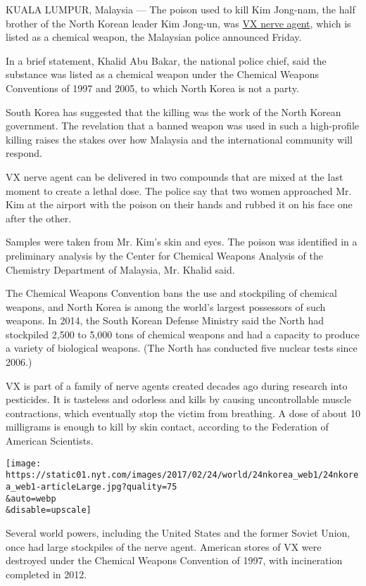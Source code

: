 KUALA LUMPUR, Malaysia --- The poison used to kill Kim Jong-nam, the
half brother of the North Korean leader Kim Jong-un, was
\href{https://www.nytimes.com/2017/02/24/world/asia/vx-nerve-agent-kim-jong-nam.html}{VX
nerve agent}, which is listed as a chemical weapon, the Malaysian police
announced Friday.

In a brief statement, Khalid Abu Bakar, the national police chief, said
the substance was listed as a chemical weapon under the Chemical Weapons
Conventions of 1997 and 2005, to which North Korea is not a party.

South Korea has suggested that the killing was the work of the North
Korean government. The revelation that a banned weapon was used in such
a high-profile killing raises the stakes over how Malaysia and the
international community will respond.

VX nerve agent can be delivered in two compounds that are mixed at the
last moment to create a lethal dose. The police say that two women
approached Mr. Kim at the airport with the poison on their hands and
rubbed it on his face one after the other.

Samples were taken from Mr. Kim's skin and eyes. The poison was
identified in a preliminary analysis by the Center for Chemical Weapons
Analysis of the Chemistry Department of Malaysia, Mr. Khalid said.

The Chemical Weapons Convention bans the use and stockpiling of chemical
weapons, and North Korea is among the world's largest possessors of such
weapons. In 2014, the South Korean Defense Ministry said the North had
stockpiled 2,500 to 5,000 tons of chemical weapons and had a capacity to
produce a variety of biological weapons. (The North has conducted five
nuclear tests since 2006.)

VX is part of a family of nerve agents created decades ago during
research into pesticides. It is tasteless and odorless and kills by
causing uncontrollable muscle contractions, which eventually stop the
victim from breathing. A dose of about 10 milligrams is enough to kill
by skin contact, according to the Federation of American Scientists.

\texttt{[image: https://static01.nyt.com/images/2017/02/24/world/24nkorea\_web1/24nkorea\_web1-articleLarge.jpg?quality=75\\\&auto=webp\\\&disable=upscale]}

Several world powers, including the United States and the former Soviet
Union, once had large stockpiles of the nerve agent. American stores of
VX were destroyed under the Chemical Weapons Convention of 1997, with
incineration completed in 2012.

